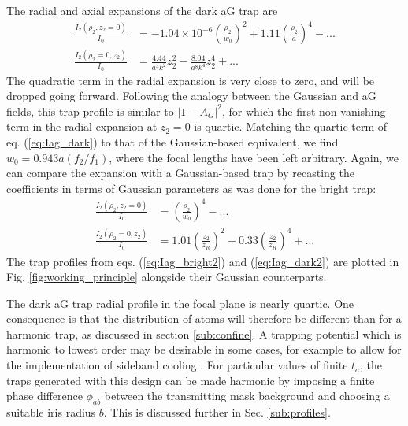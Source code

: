 The radial and axial expansions of the dark aG trap are  
\begin{equation} \label{eq:Iag_dark}
    \begin{aligned}
    \frac{I_2(\rho_2,z_2=0)}{I_0} &= -1.04\times10^{-6} \left(\frac{\rho_2}{w_0}\right)^2 + 1.11 \left(\frac{\rho_2}{a}\right)^4 - ... \\
    \frac{I_2(\rho_2=0,z_2)}{I_0} &= \frac{4.44}{a^4 k^2}z_2^2 - \frac{8.04 }{a^8 k^4}z_2^4 + ...
    \end{aligned}
\end{equation}
 The quadratic term in the radial expansion is very close to zero, and will be dropped going forward. Following the analogy between the Gaussian and aG fields, this trap profile is similar to $|1 - A_G|^2$, for which the first non-vanishing term in the radial expansion at $z_2=0$ is quartic. Matching the quartic term of eq. (\ref{eq:Iag_dark}) to that of the Gaussian-based equivalent, we find $w_0=0.943a(f_2/f_1)$, where the focal lengths have been left arbitrary. Again, we can compare the expansion with a Gaussian-based trap by recasting the coefficients in terms of Gaussian parameters as was done for the bright trap:
\begin{equation} \label{eq:Iag_dark2}
    \begin{aligned}
    \frac{I_2(\rho_2,z_2=0)}{I_0} &= \left(\frac{\rho_2}{w_0}\right)^4 - ... \\
    \frac{I_2(\rho_2=0,z_2)}{I_0} &= 1.01\left(\frac{z_2}{z_R}\right)^2 - 0.33 \left(\frac{z_2}{z_R}\right)^4 + ...
    \end{aligned}
\end{equation}
The trap profiles from eqs. (\ref{eq:Iag_bright2}) and (\ref{eq:Iag_dark2}) are plotted in Fig. \ref{fig:working_principle} alongside their Gaussian counterparts.

The dark aG trap radial profile in the focal plane is nearly quartic. One consequence is that the distribution of atoms will therefore be different than for a harmonic trap, as discussed in section \ref{sub:confine}. A trapping potential which is harmonic to lowest order may be desirable in some cases, for example to allow for the implementation of sideband cooling \cite{Wineland1979}. For particular values of finite $t_a$, the traps generated with this design can be made harmonic by imposing a finite phase difference $\phi_{ab}$ between the transmitting mask background and choosing a suitable iris radius $b$. This is discussed further in Sec. \ref{sub:profiles}.

